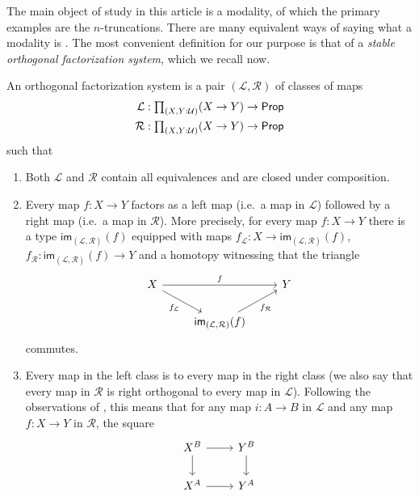 \documentclass[9pt,twosided]{amsart}
\begin{document}
The main object of study in this article is a modality, of which the primary examples are the $n$-truncations. There are many equivalent ways of saying what a modality is \cite{RijkeSpittersShulman}. The most convenient definition for our purpose is that of a \emph{stable orthogonal factorization system}, which we recall now.

\begin{defn}
  An orthogonal factorization system is a pair $(\mathcal{L},\mathcal{R})$ of classes of maps
  \begin{align*}
    \mathcal{L} & : \prd{X,Y:\UU} (X \to Y) \to \mathsf{Prop} \\
    \mathcal{R} & : \prd{X,Y:\UU} (X \to Y) \to \mathsf{Prop} 
  \end{align*}
  such that
  \begin{enumerate}
  \item Both $\mathcal{L}$ and $\mathcal{R}$ contain all equivalences and are closed under composition.
  \item Every map $f:X\to Y$ factors as a left map (i.e.~a map in $\mathcal{L}$) followed by a right map (i.e.~a map in $\mathcal{R}$). More precisely, for every map $f:X\to Y$ there is a type $\mathsf{im}_{(\mathcal{L},\mathcal{R})}(f)$ equipped with maps $f_{\mathcal{L}}:X\to \mathsf{im}_{(\mathcal{L},\mathcal{R})}(f)$, $f_{\mathcal{R}}:\mathsf{im}_{(\mathcal{L},\mathcal{R})}(f) \to Y$ and a homotopy witnessing that the triangle
    \begin{equation*}
      \begin{tikzcd}
        X \arrow[rr,"f"] \arrow[dr,swap,"f_{\mathcal{L}}"] & & Y \\
        & \mathsf{im}_{(\mathcal{L},\mathcal{R})}(f) \arrow[ur,swap,"f_{\mathcal{R}}"]
      \end{tikzcd}
    \end{equation*}
    commutes.
  \item Every map in the left class is  to every map in the right class (we also say that every map in $\mathcal{R}$ is right orthogonal to every map in $\mathcal{L}$). Following the observations of \cite{AnelBiedermanFinsterJoyal}, this means that for any map $i:A \to B$ in $\mathcal{L}$ and any map $f:X \to Y$ in $\mathcal{R}$, the square
    \begin{equation*}
      \begin{tikzcd}
        X^B \arrow[r] \arrow[d] & Y^B \arrow[d] \\
        X^A \arrow[r] & Y^A
      \end{tikzcd}

\end{equation*}
\end{enumerate}
\end{defn}
\end{document}
